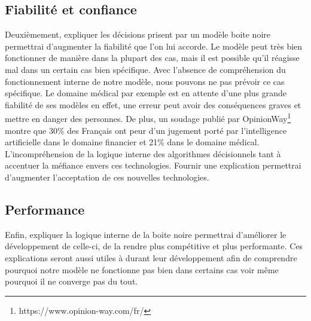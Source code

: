 \subsection{Fiabilité et confiance}
Deuxièmement, expliquer les décisions prisent par un modèle boite noire permettrai d'augmenter la fiabilité que l'on lui accorde. Le modèle peut très bien fonctionner de manière dans la plupart des cas, mais il est possible qu'il réagisse mal dans un certain cas bien spécifique. Avec l'absence de compréhension du fonctionnement interne de notre modèle, nous pouvons ne pas prévoir ce cas spécifique. Le domaine médical par exemple est en attente d'une plus grande fiabilité de ses modèles en effet, une erreur peut avoir des conséquences graves et mettre en danger des personnes. De plus, un soudage publié par OpinionWay\footnote{https://www.opinion-way.com/fr/} montre que 30\% des Français ont peur d'un jugement porté par l'intelligence artificielle dans le domaine financier et 21\% dans le domaine médical. L'incompréhension de la logique interne des algorithmes décisionnels tant à accentuer la méfiance envers ces technologies. Fournir une explication permettrai d'augmenter l'acceptation de ces nouvelles technologies.

\subsection{Performance}
Enfin, expliquer la logique interne de la boite noire permettrai d'améliorer le développement de celle-ci, de la rendre plus compétitive et plus performante. Ces explications seront aussi utiles à durant leur développement afin de comprendre pourquoi notre modèle ne fonctionne pas bien dans certains cas voir même pourquoi il ne converge pas du tout.

